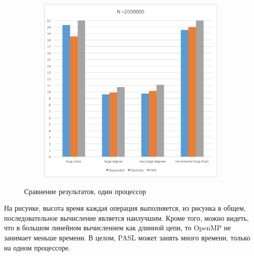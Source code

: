 \documentclass[specification,annotation,times]{itmo-student-thesis}
\newcommand{\revise}[1]{{\color{red!70!black} #1 }}
\begin{document}
\begin{figure}[!ht]
\begin{subfigure}[b]{0.45\textwidth}
\end{subfigure}~~\begin{subfigure}[b]{0.45\textwidth}
    \includegraphics[width=\textwidth]{pic/results-1-d.png}
\end{subfigure}
\caption{Сравнение результатов, один процессор}\label{fig:results-comparison-1}
\end{figure}

\revise{
На рисунке, высота время каждая операция выполняется, из рисунка в общем, последовательное вычисление является наилучшим. Кроме того, можно видеть, что в большом линейном вычислением как длинной цепи, то 
OpenMP не занимает меньше времени. В целом, PASL может занять много времени, только на одном процессоре.
}
\end{document}
